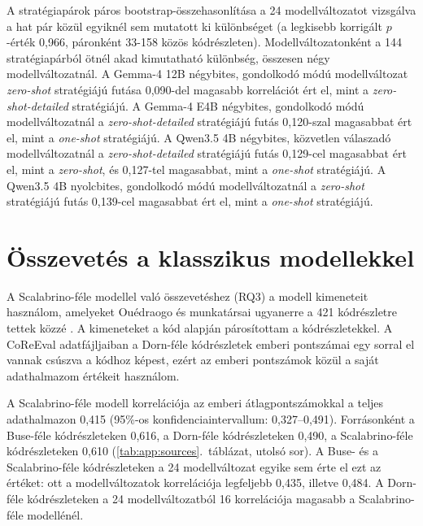 \documentclass[
]{elteikthesis}[2024/04/26]
\begin{document}
A stratégiapárok páros bootstrap-összehasonlítása a 24 modellváltozatot
vizsgálva a hat pár közül egyiknél sem mutatott ki különbséget (a legkisebb
korrigált $p$-érték 0,966, páronként 33-158 közös kódrészleten).
Modellváltozatonként a 144 stratégiapárból ötnél akad kimutatható különbség,
összesen négy modellváltozatnál. A Gemma-4 12B négybites, gondolkodó módú
modellváltozat \textit{zero-shot} stratégiájú futása 0,090-del magasabb %
korrelációt ért el, mint a \textit{zero-shot-detailed} stratégiájú. A Gemma-4
E4B négybites, gondolkodó módú modellváltozatnál a \textit{zero-shot-detailed}
stratégiájú futás 0,120-szal magasabbat ért el, mint a \textit{one-shot}
stratégiájú. A Qwen3.5 4B négybites, közvetlen válaszadó modellváltozatnál a
\textit{zero-shot-detailed} stratégiájú futás 0,129-cel magasabbat ért el, mint
a \textit{zero-shot}, és 0,127-tel magasabbat, mint a \textit{one-shot}
stratégiájú. A Qwen3.5 4B nyolcbites, gondolkodó módú modellváltozatnál a
\textit{zero-shot} stratégiájú futás 0,139-cel magasabbat ért el, mint a
\textit{one-shot} stratégiájú.

\section{Összevetés a klasszikus modellekkel} %
\label{sec:results:classic}

A Scalabrino-féle modellel való összevetéshez (RQ3) a modell kimeneteit
használom, amelyeket Ouédraogo és munkatársai ugyanerre a 421 kódrészletre
tettek közzé \cite{ouedraogo2025coreeval}. A kimeneteket a kód alapján
párosítottam a kódrészletekkel. A CoReEval adatfájljaiban a Dorn-féle
kódrészletek emberi pontszámai egy sorral el vannak csúszva a kódhoz képest,
ezért az emberi pontszámok közül a saját adathalmazom értékeit használom.

A Scalabrino-féle modell korrelációja az emberi átlagpontszámokkal a teljes
adathalmazon 0,415 (95\%-os konfidenciaintervallum: 0,327--0,491). Forrásonként
a Buse-féle kódrészleteken 0,616, a Dorn-féle kódrészleteken 0,490, a
Scalabrino-féle kódrészleteken 0,610 (\ref{tab:app:sources}.~táblázat, utolsó
sor). A Buse- és a Scalabrino-féle kódrészleteken a 24 modellváltozat egyike sem
érte el ezt az értéket: ott a modellváltozatok korrelációja legfeljebb 0,435,
illetve 0,484. A Dorn-féle kódrészleteken a 24 modellváltozatból 16 korrelációja
magasabb a Scalabrino-féle modellénél.
\end{document}
